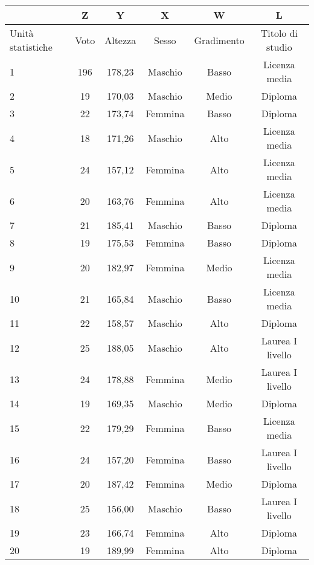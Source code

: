 \begin{tabular}{|p{1.5cm}|c|c|c|c|c|}
\hline
        &Z&     Y       &X      &W      &L\\
        \hline
Unità statistiche &     Voto&   Altezza &Sesso& Gradimento&     Titolo di 
studio\\
\hline
        1&      196&    178,23  &Maschio&       Basso&  Licenza media\\
        \hline
        2&      19&     170,03& Maschio &Medio& Diploma\\
        \hline
        3&      22      &173,74 &Femmina&       Basso&  Diploma\\
        \hline
        4       &18&    171,26& Maschio&        Alto&   Licenza media\\
        \hline
        5&      24&     157,12& Femmina&        Alto&   Licenza media\\
        \hline
        6&      20      &163,76&        Femmina &Alto&  Licenza media\\
        \hline
        7&      21&     185,41& Maschio &Basso  &Diploma\\
        \hline
        8       &19&    175,53& Femmina&        Basso   &Diploma\\
        \hline
        9&      20&     182,97& Femmina&        Medio&  Licenza media\\
        \hline
        10&     21      &165,84&        Maschio&        Basso   &Licenza 
media\\
        \hline
        11      &22     &158,57 &Maschio&       Alto    &Diploma\\
        \hline
        12      &25     &188,05&        Maschio&        Alto&   Laurea I 
livello\\
        \hline
        13      &24&    178,88& Femmina&        Medio&  Laurea I livello\\
        \hline
        14      &19&    169,35& Maschio&        Medio&  Diploma\\
        \hline
        15      &22&    179,29& Femmina&        Basso&  Licenza media\\
        \hline
        16&     24      &157,20 &Femmina&       Basso&  Laurea I livello\\
        \hline
        17&     20      &187,42&        Femmina&        Medio&  Diploma\\
        \hline
        18      &25&    156,00& Maschio &Basso  &Laurea I livello\\
        \hline
        19&     23&     166,74& Femmina&        Alto&   Diploma\\
        \hline
        20&     19      &189,99&        Femmina &Alto&  Diploma\\
        \hline

\end{tabular}\\
